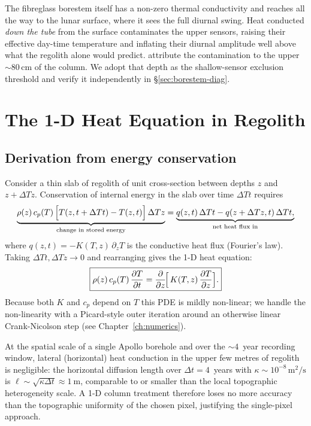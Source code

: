 \documentclass[11pt]{report}
\newcommand{\dT}{\Delta T}
\newcommand{\zborestem}{80\,\si{\centi\meter}}
\begin{document}
\begin{warn}
The fibreglass borestem itself has a non-zero thermal conductivity
and reaches all the way to the lunar surface, where it sees the full
diurnal swing. Heat conducted \emph{down the tube} from the surface
contaminates the upper sensors, raising their effective day-time
temperature and inflating their diurnal amplitude well above what the
regolith alone would predict. \citet{nagihara2018} attribute the
contamination to the upper $\sim\!\zborestem$ of the column. We
adopt that depth as the shallow-sensor exclusion threshold and
verify it independently in \S\ref{sec:borestem-diag}.
\end{warn}

\chapter{The 1-D Heat Equation in Regolith}\label{ch:pde}

\section{Derivation from energy conservation}

Consider a thin slab of regolith of unit cross-section between depths
$z$ and $z+\dT z$. Conservation of internal energy in the slab over
time $\dT t$ requires
\[
\underbrace{\rho(z)\,c_p(T)\,\Bigl[T(z,t+\dT t)-T(z,t)\Bigr]\,\dT z}_{\text{change in stored energy}}
=
\underbrace{q(z,t)\,\dT t - q(z+\dT z,t)\,\dT t,}_{\text{net heat flux in}}
\]
where $q(z,t)=-K(T,z)\,\partial_z T$ is the conductive heat flux
(Fourier's law). Taking $\dT t,\dT z\to 0$ and rearranging gives the
1-D heat equation:
\begin{equation}
\boxed{
\rho(z)\,c_p(T)\,\frac{\partial T}{\partial t}
   = \frac{\partial}{\partial z}\!\Bigl[\,K(T,z)\,\frac{\partial T}{\partial z}\Bigr].
}\label{eq:heat-rep}
\end{equation}
Because both $K$ and $c_p$ depend on $T$ this PDE is mildly
non-linear; we handle the non-linearity with a Picard-style outer
iteration around an otherwise linear Crank-Nicolson step
(see Chapter~\ref{ch:numerics}).

\begin{aside}
At the spatial scale of a single Apollo borehole and over the
$\sim\!4$~year recording window, lateral (horizontal) heat
conduction in the upper few metres of regolith is negligible: the
horizontal diffusion length over $\Delta t = 4$~years with
$\kappa\sim10^{-8}\,\si{\meter\squared\per\second}$ is
$\ell\sim\sqrt{\kappa\Delta t}\approx \SI{1}{\meter}$, comparable to
or smaller than the local topographic heterogeneity scale. A 1-D
column treatment therefore loses no more accuracy than the topographic
uniformity of the chosen pixel, justifying the single-pixel approach.
\end{aside}
\end{document}
